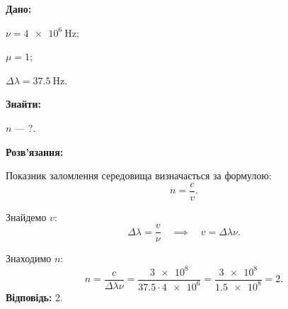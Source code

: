 \documentclass[a4paper,oneside,DIV=9,12pt]{scrartcl}
\newcommand\given{\noindent\textbf{Дано:}}
\newcommand\find{\noindent\textbf{Знайти:}}
\newcommand\solution{\noindent\textbf{Розв'язання:}}
\newcommand\answer[1]{\noindent\textbf{Відповідь:} #1}
\begin{document}
	
	\given\par
		$\nu = \SI{4e6}{\hertz}$;
		
		$\mu = 1$;
		
		$\Delta \lambda = \SI{37,5}{\hertz}$.
		
	\find\par
		$n$ --- ?.
		
	\solution\par
		Показник заломлення середовища визначається за формулою:
		\[
			n = \frac{c}{v}.
		\]
		
		Знайдемо $v$:
		\[
			\Delta \lambda = \frac{v}{\nu} \quad \implies \quad v = \Delta \lambda \nu.
		\]
		
		Знаходимо $n$:
		\[
			n = \frac{c}{\Delta \lambda \nu} = \frac{\num{3e8}}{\num{37,5} \cdot \num{4e6}} = \frac{\num{3e8}}{\num{1,5e8}} = \num{2}.
		\]
	\answer{2}.
	
\end{document}
